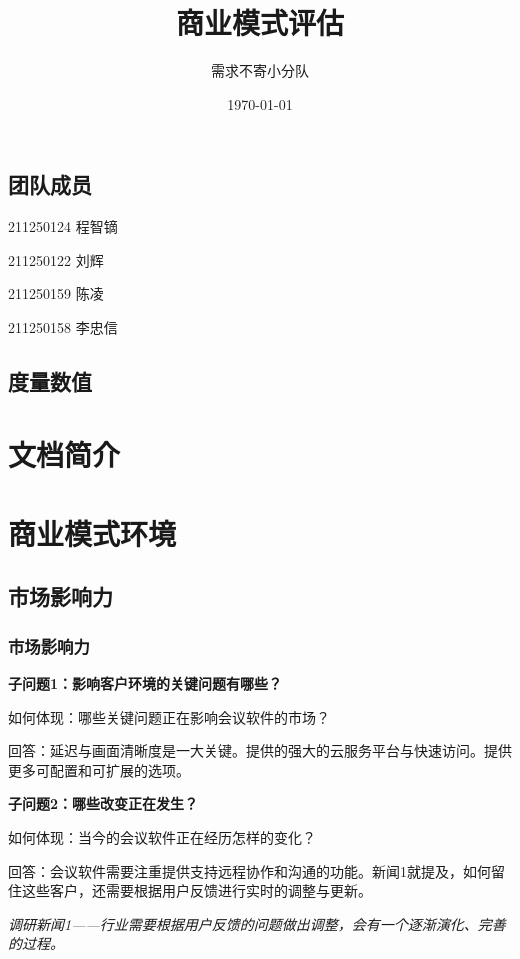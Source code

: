 \documentclass[a4paper,12pt]{article}
\title{商业模式评估}
\author{需求不寄小分队}
\date{\today}
\begin{document}
    \maketitle

    \tableofcontents

    \subsection{团队成员}
    211250124 程智镝

    211250122 刘辉

    211250159 陈凌

    211250158 李忠信
    \subsection{度量数值}

    \section{文档简介}
    

     \section{商业模式环境}
    \subsection{市场影响力}
    \subsubsection{市场影响力}
    \textbf{子问题1：影响客户环境的关键问题有哪些？}
    
    如何体现：哪些关键问题正在影响会议软件的市场？
    
    回答：延迟与画⾯清晰度是⼀⼤关键。提供的强⼤的云服务平台与快速访问。提供更多可配置和可扩展的选项。
    
    \textbf{子问题2：哪些改变正在发生？}

    如何体现：当今的会议软件正在经历怎样的变化？

    回答：会议软件需要注重提供支持远程协作和沟通的功能。新闻1就提及，如何留住这些客户，还需要根据⽤户反馈进⾏实时的调整与更新。

    \textit{调研新闻1——⾏业需要根据⽤户反馈的问题做出调整，会有⼀个逐渐演化、完善的过程。}
    
\end{document}
